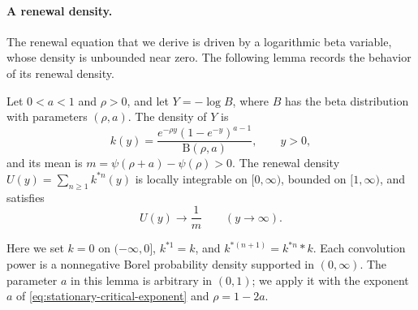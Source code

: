 \paragraph{A renewal density.} The renewal equation that we derive is driven by a logarithmic beta variable, whose density is unbounded near zero. The following lemma records the behavior of its renewal density.

\begin{lemma}
\label{lem:log-beta-renewal-density}
Let $0<a<1$ and $\rho>0$, and let $Y=-\log B$, where $B$ has the beta distribution with parameters $(\rho,a)$. The density of $Y$ is
\[
 k(y)=\frac{e^{-\rho y}(1-e^{-y})^{a-1}}{\mathrm B(\rho,a)},
 \qquad y>0,
\]
and its mean is $m=\psi(\rho+a)-\psi(\rho)>0$.
The renewal density $U(y)=\sum_{n\ge1}k^{*n}(y)$ is locally integrable on $[0,\infty)$, bounded on $[1,\infty)$, and satisfies
\begin{equation}
 U(y)\longrightarrow\frac1m\qquad(y\to\infty).
 \label{eq:log-beta-renewal-limit}
\end{equation}
\end{lemma}

Here we set $k=0$ on $(-\infty,0]$, $k^{*1}=k$, and $k^{*(n+1)}=k^{*n}*k$. Each convolution power is a nonnegative Borel probability density supported in $(0,\infty)$. The parameter $a$ in this lemma is arbitrary in $(0,1)$; we apply it with the exponent $a$ of \eqref{eq:stationary-critical-exponent} and $\rho=1-2a$.

